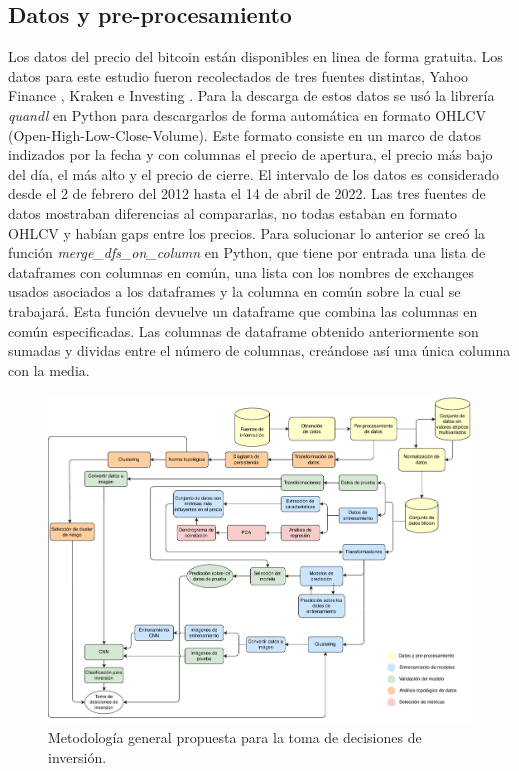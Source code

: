 \subsection{Datos y pre-procesamiento}
Los datos del precio del bitcoin están disponibles en linea de forma gratuita. Los datos para este estudio fueron recolectados de tres fuentes distintas, Yahoo Finance \parencite{YahooFinanceStock}, Kraken \parencite{BitcoinCryptocurrencyExchange} e Investing \parencite{InvestingComStock}. Para la descarga de estos datos se usó la librería \emph{quandl} en Python para descargarlos de forma automática en formato OHLCV (Open-High-Low-Close-Volume). Este formato consiste en un marco de datos indizados por la fecha y con columnas el precio de apertura, el precio más bajo del día, el más alto y el precio de cierre. El intervalo de los datos es considerado desde el 2 de febrero del 2012 hasta el 14 de abril de 2022.
Las tres fuentes de datos mostraban diferencias al compararlas, no todas estaban en formato OHLCV y habían gaps entre los precios. Para solucionar lo anterior se creó la función \emph{merge\_dfs\_on\_column} en Python, que tiene por entrada una lista de dataframes con columnas en común, una lista con los nombres de exchanges usados asociados a los dataframes y la columna en común sobre la cual se trabajará. Esta función devuelve un dataframe que combina las columnas en común especificadas. Las columnas de dataframe obtenido anteriormente son sumadas y dividas entre el número de columnas, creándose así una única columna con la media.

\begin{landscape}
	\begin{figure}
		\centering
		\includegraphics[scale=0.7]{Chapter3/Meto-3.pdf}
		\caption{Metodología general propuesta para la toma de decisiones de inversión.}
		\label{fig4}
	\end{figure}
\end{landscape}

